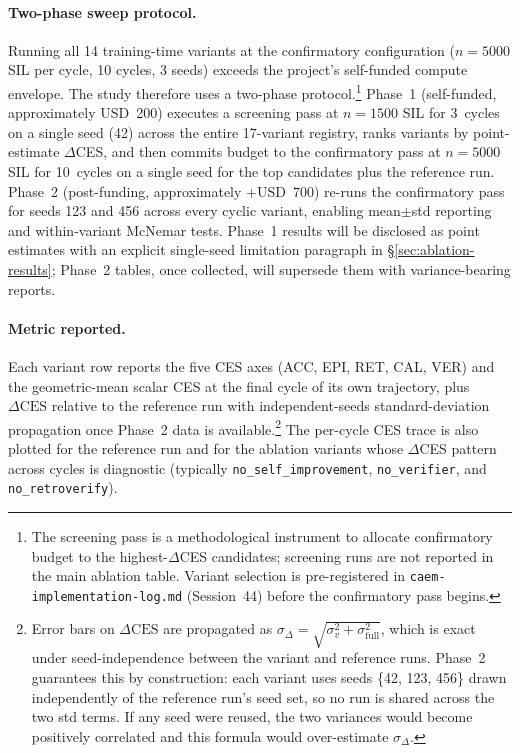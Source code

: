 \paragraph{Two-phase sweep protocol.}
Running all 14 training-time variants at the confirmatory
configuration ($n=5000$ SIL per cycle, 10 cycles, 3 seeds) exceeds the
project's self-funded compute envelope. The study therefore uses a
two-phase protocol.\footnote{The screening pass is a methodological
instrument to allocate confirmatory budget to the highest-$\Delta$CES
candidates; screening runs are not reported in the main ablation table.
Variant selection is pre-registered in
\texttt{caem-implementation-log.md} (Session~44) before the confirmatory
pass begins.} Phase~1 (self-funded, approximately USD~200) executes a
screening pass at $n=1500$ SIL for 3~cycles on a single seed (42) across
the entire 17-variant registry, ranks variants by point-estimate
$\Delta$CES, and then commits budget to the confirmatory pass at
$n=5000$ SIL for 10~cycles on a single seed for the top candidates
plus the reference run. Phase~2 (post-funding, approximately
+USD~700) re-runs the confirmatory pass for seeds 123 and 456 across
every cyclic variant, enabling mean$\pm$std reporting and
within-variant McNemar tests. Phase~1 results will be disclosed as
point estimates with an explicit single-seed limitation paragraph in
\S\ref{sec:ablation-results}; Phase~2 tables, once collected, will
supersede them with variance-bearing reports.

\paragraph{Metric reported.}
Each variant row reports the five CES axes
(ACC, EPI, RET, CAL, VER) and the geometric-mean scalar CES at the
final cycle of its own trajectory, plus $\Delta\text{CES}$ relative to
the reference run with independent-seeds standard-deviation propagation
once Phase~2 data is available.\footnote{Error bars on
$\Delta\text{CES}$ are propagated as
$\sigma_{\Delta} = \sqrt{\sigma_v^{2} + \sigma_{\text{full}}^{2}}$,
which is exact under seed-independence between the variant and
reference runs. Phase~2 guarantees this by construction: each variant
uses seeds \{42, 123, 456\} drawn independently of the reference run's
seed set, so no run is shared across the two std terms. If any seed
were reused, the two variances would become positively correlated and
this formula would over-estimate $\sigma_{\Delta}$.} The per-cycle CES
trace is also plotted for the reference run and for the ablation
variants whose $\Delta$CES pattern across cycles is diagnostic
(typically \texttt{no\_self\_improvement}, \texttt{no\_verifier}, and
\texttt{no\_retroverify}).

